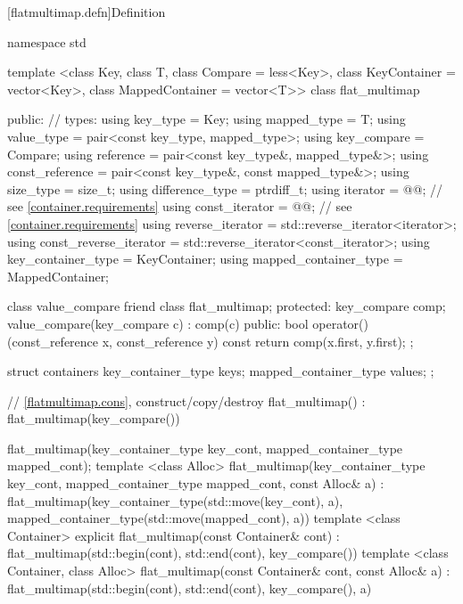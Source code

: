 \begin{codeblock}
\begin{codeblock}
\begin{codeblock}
\begin{addedblock}
[flatmultimap.defn]{Definition}

\begin{codeblock}
namespace std {
  template <class Key, class T, class Compare = less<Key>,
            class KeyContainer = vector<Key>,
            class MappedContainer = vector<T>>
  class flat_multimap {
  public:
    // types:
    using key_type                  = Key;
    using mapped_type               = T;
    using value_type                = pair<const key_type, mapped_type>;
    using key_compare               = Compare;
    using reference                 = pair<const key_type&, mapped_type&>;
    using const_reference           = pair<const key_type&, const mapped_type&>;
    using size_type                 = size_t;
    using difference_type           = ptrdiff_t;
    using iterator                  = @@; // see \ref{container.requirements}
    using const_iterator            = @@; // see \ref{container.requirements}
    using reverse_iterator          = std::reverse_iterator<iterator>;
    using const_reverse_iterator    = std::reverse_iterator<const_iterator>;
    using key_container_type        = KeyContainer;
    using mapped_container_type     = MappedContainer;

    class value_compare {
      friend class flat_multimap;
    protected:
      key_compare comp;
      value_compare(key_compare c) : comp(c) { }
    public:
      bool operator()(const_reference x, const_reference y) const {
        return comp(x.first, y.first);
      }
    };

    struct containers
    {
      key_container_type keys;
      mapped_container_type values;
    };

    // \ref{flatmultimap.cons}, construct/copy/destroy
    flat_multimap() : flat_multimap(key_compare()) { }

    flat_multimap(key_container_type key_cont, mapped_container_type mapped_cont);
    template <class Alloc>
    flat_multimap(key_container_type key_cont, mapped_container_type mapped_cont,
                  const Alloc& a)
        : flat_multimap(key_container_type(std::move(key_cont), a),
                        mapped_container_type(std::move(mapped_cont), a))
      { }
    template <class Container>
      explicit flat_multimap(const Container& cont)
        : flat_multimap(std::begin(cont), std::end(cont), key_compare()) { }
    template <class Container, class Alloc>
      flat_multimap(const Container& cont, const Alloc& a)
        : flat_multimap(std::begin(cont), std::end(cont), key_compare(), a) { }

}}
\end{codeblock}
\end{addedblock}
\end{codeblock}
\end{codeblock}
\end{codeblock}
